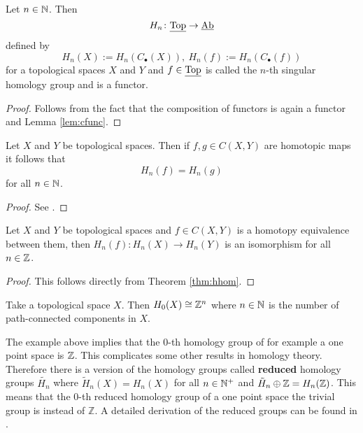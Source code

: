 \begin{thm}\label{thm:hfunc}
  Let $n \in \mathbb{N}$. Then \[H_n\colon \underline{\rm Top} \to \underline{\rm Ab} \]
  defined by \[H_n(X) := H_n(C_\bullet(X)), \: H_n(f) := H_n(C_\bullet(f))\]
  for a topological spaces $X$ and $Y$ and $f \in \underline{\rm Top}$ is called the $n$-th singular homology group and  is a functor. 
\end{thm}

\begin{proof}
  Follows from the fact that the composition of functors is again a functor and Lemma \ref{lem:cfunc}.
\end{proof}

\begin{thm}\label{thm:hhom}
  Let $X$ and $Y$ be topological spaces. Then if $f, g\in C(X, Y)$ are homotopic maps it follows that \[H_n(f) = H_n(g)\] for all $n \in \mathbb{N}$.
\end{thm}

\begin{proof}
  See \cite[p. 112f]{hatcher}.
\end{proof}

\begin{col}
  Let $X$ and $Y$ be topological spaces and $f \in C(X, Y)$ is a homotopy equivalence between them, then $H_n(f)\colon H_n(X) \to H_n(Y)$ is an isomorphism for all $n \in \mathbb{Z}$.
\end{col}

\begin{proof}
  This follows directly from Theorem \ref{thm:hhom}.
\end{proof}

\begin{ex}
  Take a topological space $X$. Then $H_0(X) \cong \mathbb{Z}^n$ where $n \in \mathbb{N}$ is the number of path-connected components in $X$. 
\end{ex}

The example above implies that the $0$-th homology group of for example a one point space is $\mathbb{Z}$. This complicates some other results in homology theory. Therefore there is a version of the homology groups called \textbf{reduced} homology groups $\tilde{H_n}$ where $\tilde{H}_n(X) = H_n(X)$ for all $n \in\mathbb{N}^+$ and $\tilde{H}_n \oplus \mathbb{Z} = H_n(\mathbb{Z})$. This means that the $0$-th reduced homology group of a one point space the trivial group is instead of $\mathbb{Z}$.
A detailed derivation of the reduced groups can be found in \cite[p. 110]{hatcher}.

